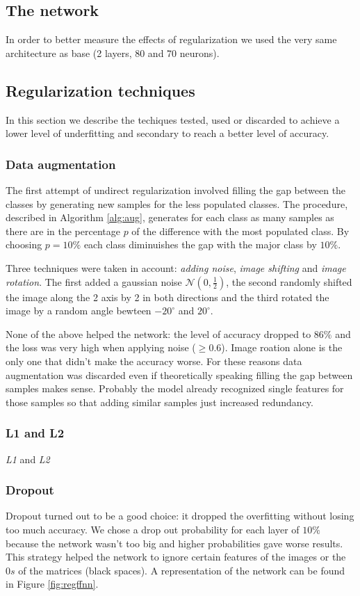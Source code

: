 \documentclass[compsoc]{IEEEtran}
\begin{document}
\subsection{The network}
In order to better measure the effects of regularization we used the very same architecture as base (2 layers, 80 and 70 neurons).


\subsection{Regularization techniques}
In this section we describe the techiques tested, used or discarded to achieve a lower level of underfitting and secondary to reach a better level of accuracy.

\subsubsection{Data augmentation}
The first attempt of undirect regularization involved filling the gap between the classes by generating new samples for the less populated classes. The procedure, described in Algorithm \ref{alg:aug}, generates for each class as many samples as there are in the percentage $p$ of the difference with the most populated class.
By choosing $p=10\%$ each class diminuishes the gap with the major class by $10\%$. \par
Three techniques were taken in account: \emph{adding noise}, \emph{image shifting} and \emph{image rotation}. The first added a gaussian noise $\mathcal{N}(0, \frac{1}{2})$, the second randomly shifted the image along the 2 axis by 2 in both directions and the third rotated the image by a random angle bewteen $-20^{\circ}$ and $20^{\circ}$. \par
None of the above helped the network: the level of accuracy dropped to $86\%$ and the loss was very high when applying noise ($\geq 0.6$). Image roation alone is the only one that didn't make the accuracy worse. For these reasons data augmentation was discarded even if theoretically speaking filling the gap between samples makes sense. Probably the model already recognized single features for those samples so that adding similar samples just increased redundancy.


\subsubsection{L1 and L2}
\emph{L1} and \emph{L2}

\subsubsection{Dropout}
Dropout turned out to be a good choice: it dropped the overfitting without losing too much accuracy. We chose a drop out probability for each layer of $10\%$ because the network wasn't too big and higher probabilities gave worse results. This strategy helped the network to ignore certain features of the images or the $0s$ of the matrices (black spaces). A representation of the network can be found in Figure \ref{fig:regffnn}. 
\end{document}
